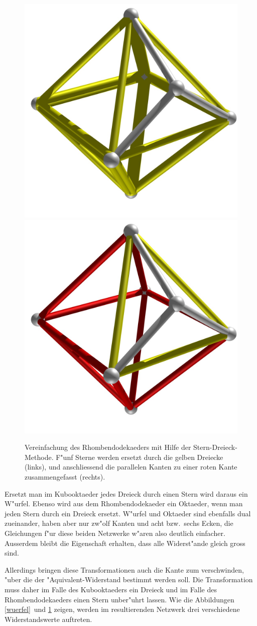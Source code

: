 \documentclass[a4paper,12pt]{article}
\begin{document}
\begin{figure}
\centering
\includegraphics[width=0.45\hsize]{oktaeder.jpg}
\quad
\includegraphics[width=0.45\hsize]{oktaeder2.jpg}
\caption{Vereinfachung des Rhombendodekaeders mit Hilfe der
Stern-Dreieck-Methode.
F"unf Sterne werden ersetzt durch die gelben Dreiecke (links), und
anschliessend die parallelen Kanten zu einer roten Kante zusammengefasst
(rechts).
\label{oktaeder}}
\end{figure}
Ersetzt man im Kubooktaeder jedes Dreieck durch einen Stern
wird daraus ein W"urfel.
Ebenso wird aus dem Rhombendodekaeder ein Oktaeder, wenn man
jeden Stern durch ein Dreieck ersetzt.
W"urfel und Oktaeder sind ebenfalls dual zueinander, haben aber 
nur zw"olf Kanten und acht bzw.~sechs Ecken, die Gleichungen
f"ur diese beiden Netzwerke w"aren also deutlich einfacher.
Ausserdem bleibt die Eigenschaft erhalten, dass alle Widerst"ande
gleich gross sind.

Allerdings bringen diese Transformationen auch die Kante zum
verschwinden, "uber die der "Aquivalent-Widerstand bestimmt werden
soll.
Die Transformation muss daher im Falle des Kubooktaeders ein Dreieck 
und im Falle des Rhombendodekaeders einen Stern unber"uhrt lassen.
Wie die Abbildungen \ref{wuerfel}{} und \ref{oktaeder}
zeigen, werden im resultierenden Netzwerk drei verschiedene Widerstandswerte
auftreten.
\end{document}
